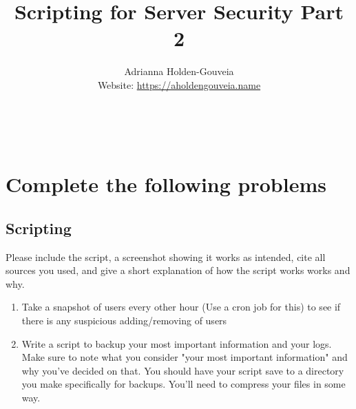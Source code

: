 \documentclass[12pt]{article}
\title{Scripting for Server Security Part 2}
\author{
        Adrianna Holden-Gouveia \\
        Website: \url{https://aholdengouveia.name}\\ 
        \date{\vspace{-5ex}}
        \faLinkedin{: aholdengouveia} \\
        \faGithub {: aholdengouveia} \\
        }
\begin{document}
    

\maketitle


\section*{Complete the following problems}

\subsection*{Scripting}

Please include the script, a screenshot showing it works as intended, cite all sources you used, and give a short explanation of how the script works works and why.

    \begin{enumerate}
        \item Take a snapshot of users every other hour (Use a cron job for this) to see if there is any suspicious adding/removing of users 
        \item Write a script to backup your most important information and your logs.  Make sure to note what you consider "your most important information" and why you've decided on that.  You should have your script save to a directory you make specifically for backups.  You'll need to compress your files in some way.
    \end{enumerate}    
\end{document}
